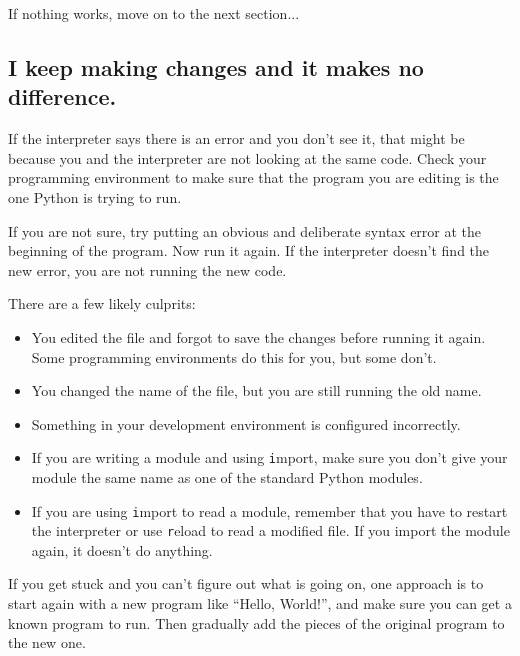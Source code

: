 \documentclass[
DIV=11,
fontsize=12,
twoside,
headinclude=false,
titlepage=firstiscover,
abstract=true,
headsepline=true,
footsepline=true,
chapterprefix=true, %
headings=big,
bibliography=totoc,%
captions=tableheading
]{scrbook}
\theoremstyle{definition}
\begin{document}
If nothing works, move on to the next section...


\subsection{I keep making changes and it makes no difference.}

If the interpreter says there is an error and you don't see it, that
might be because you and the interpreter are not looking at the same
code.  Check your programming environment to make sure that the
program you are editing is the one Python is trying to run.

If you are not sure, try putting an obvious and deliberate syntax
error at the beginning of the program.  Now run it again.  If the
interpreter doesn't find the new error, you are not running the
new code.

There are a few likely culprits:

\begin{itemize}

\item You edited the file and forgot to save the changes before
running it again.  Some programming environments do this
for you, but some don't.

\item You changed the name of the file, but you are still running
the old name.

\item Something in your development environment is configured
incorrectly.

\item If you are writing a module and using {\texttt import},
make sure you don't give your module the same name as one
of the standard Python modules.

\item If you are using {\texttt import} to read a module, remember
that you have to restart the interpreter or use {\texttt reload}
to read a modified file.  If you import the module again, it
doesn't do anything.

\end{itemize}

If you get stuck and you can't figure out what is going on, one
approach is to start again with a new program like ``Hello, World!'',
and make sure you can get a known program to run.  Then gradually add
the pieces of the original program to the new one.
\end{document}
